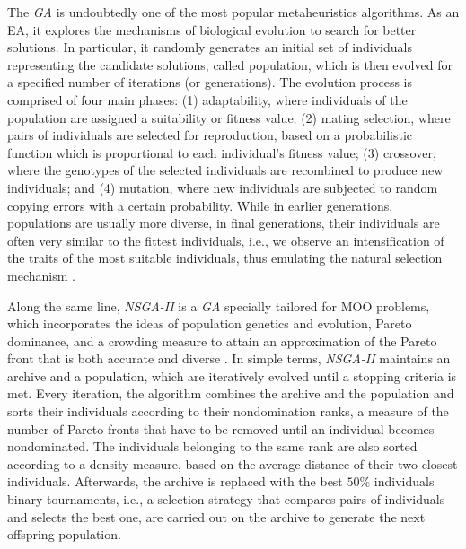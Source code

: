 	The \textit{\ac{GA}} is undoubtedly one of the most popular metaheuristics algorithms. As an \ac{EA}, it explores the mechanisms of biological evolution to search for better solutions. In particular, it randomly generates an initial set of individuals representing the candidate solutions, called population, which is then evolved for a specified number of iterations (or generations). The evolution process is comprised of four main phases: (1) adaptability, where individuals of the population are assigned a suitability or fitness value; (2) mating selection, where pairs of individuals are selected for reproduction, based on a probabilistic function which is proportional to each individual's fitness value; (3) crossover, where the genotypes of the selected individuals are recombined to produce new individuals; and (4) mutation, where new individuals are subjected to random copying errors with a certain probability. While in earlier generations, populations are usually more diverse, in final generations, their individuals are often very similar to the fittest individuals, i.e., we observe an intensification of the traits of the most suitable individuals, thus emulating the natural selection mechanism \cite{Brownlee2011}. %
	
	Along the same line, \textit{\ac{NSGA-II}} is a \textit{\ac{GA}} specially tailored for \ac{MOO} problems, which incorporates the ideas of population genetics and evolution, Pareto dominance, and a crowding measure to attain an approximation of the Pareto front that is both accurate and diverse \cite{Deb2002}. In simple terms, \textit{\ac{NSGA-II}} maintains an archive and a population, which are iteratively evolved until a stopping criteria is met. Every iteration, the algorithm combines the archive and the population and sorts their individuals according to their nondomination ranks, a measure of the number of Pareto fronts that have to be removed until an individual becomes nondominated. The individuals belonging to the same rank are also sorted according to a density measure, based on the average distance of their two closest individuals. Afterwards, the archive is replaced with the best $50\%$ individuals binary tournaments, i.e., a selection strategy that compares pairs of individuals and selects the best one, are carried out on the archive to generate the next offspring population. 

